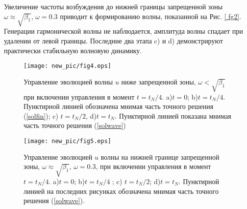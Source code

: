 Увеличение частоты возбуждения до нижней границы запрещенной зоны $ \omega \approx \sqrt {\beta_1} $, $\omega = 0.3 $ приводит к формированию волны, показанной на Рис. \ref{ fg2}. Генерации гармонической волны не наблюдается, амплитуда волны спадает при удалении от левой границы. Последние два этапа c) и d) демонстрируют практически стабильную волновую динамику.
\begin{figure*}
\begin{center}
\texttt{[image: new\_pic/fig4.eps]}
\end{center}
\caption{ Управление эволюцией волны $ u $ ниже запрещенной зоны, $\omega<\sqrt{\beta_1}$ при включении управления в момент $t=t_N/4$. a)$t=0$; b)$ t=t_N/4$. Пунктирной линией обозначена мнимая часть точного решения (\ref{solfin}); c) $t=t_N/2$, d)$t=t_N$. Пунктирной линией показана мнимая часть точного решения (\ref{solwave}) }
\label{fg4}
  \end{figure*}
\begin{figure*}
\begin{center}
\texttt{[image: new\_pic/fig5.eps]}
\end{center}
\caption{Управление эволюцией $ u $ волны на нижней границе запрещенной зоны, $\omega \approx \sqrt{\beta_1}$, $\omega=0.3$, при включении управления в момент $t=t_N/4$. a)$t=0$; b)$ t=t_N/4$ ; c) $t=t_N/2$; d)$t=t_N$. Пунктирной линией на последних рисунках обозначена мнимая часть точного решения (\ref{solwave}).}
\label{fg5}
\end{figure*}
  
